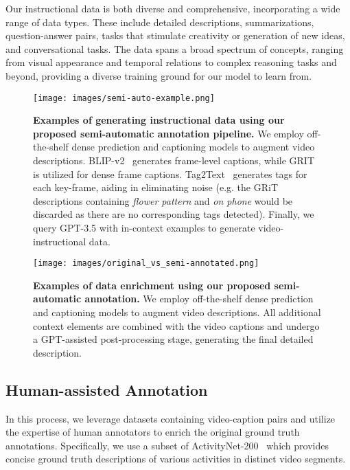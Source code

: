 Our instructional data is both diverse and comprehensive, incorporating a wide range of data types. These include detailed descriptions, summarizations, question-answer pairs, tasks that stimulate creativity or generation of new ideas, and conversational tasks. The data spans a broad spectrum of concepts, ranging from visual appearance and temporal relations to complex reasoning tasks and beyond, providing a diverse training ground for our model to learn from.

\begin{figure*}[t]
  \centering
  \texttt{[image: images/semi-auto-example.png]}
  \caption{\textbf{Examples of generating instructional data using our proposed semi-automatic annotation pipeline.} We employ off-the-shelf dense prediction and captioning models to augment video descriptions. BLIP-v2~\cite{blip-2} generates frame-level captions, while GRIT~\cite{wu2022grit} is utilized for dense frame captions. Tag2Text~\cite{huang2023tag2text} generates tags for each key-frame, aiding in eliminating noise (e.g. the GRiT descriptions containing \textit{flower pattern} and \textit{on phone} would be discarded as there are no corresponding tags detected). Finally, we query GPT-3.5 with in-context examples to generate video-instructional data.}
  \label{fig:semi_automated-1}
\end{figure*}

\begin{figure*}[t]
  \centering
  \texttt{[image: images/original\_vs\_semi-annotated.png]}
  \caption{\textbf{Examples of data enrichment using our proposed semi-automatic annotation.} We employ off-the-shelf dense prediction and captioning models \cite{blip-2, wu2022grit, huang2023tag2text} to augment video descriptions. All additional context elements are combined with the video captions and undergo a GPT-assisted post-processing stage, generating the final detailed description.}
  \label{fig:semi_automated}
\end{figure*}

\subsection{Human-assisted Annotation}
In this process, we leverage datasets containing video-caption pairs and utilize the expertise of human annotators to enrich the original ground truth annotations. Specifically, we use a subset of ActivityNet-200~\cite{caba2015activitynet} which provides concise ground truth descriptions of various activities in distinct video segments.

